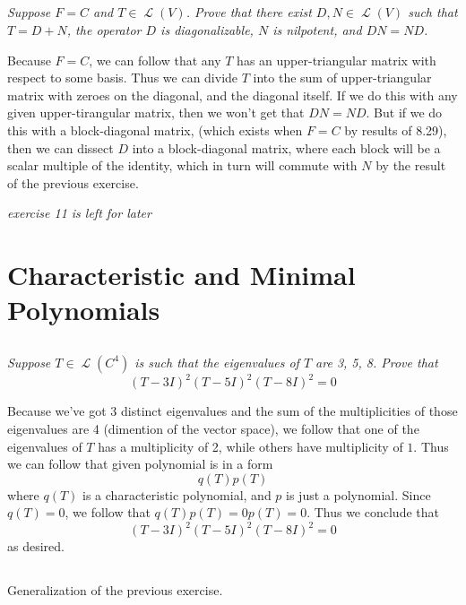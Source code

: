 \documentclass[11pt,oneside,titlepage]{book}
\DeclareMathOperator \map {\mathcal {L}}
\begin{document}
\subsection{}

\textit{Suppose $F = C$ and $T \in \map(V)$. Prove that there exist $D, N \in \map(V)$
  such that $T = D + N$, the operator $D$ is diagonalizable, $N$ is nilpotent,
  and $DN = ND$.}

Because $F = C$, we can follow that any $T$ has an upper-triangular matrix with respect to
some basis. Thus we can divide $T$ into the sum of upper-triangular matrix with zeroes on the
diagonal, and the diagonal itself. If we do this with any given upper-tirangular matrix, then
we won't get that $DN = ND$. But if we do this with a block-diagonal matrix, (which exists when
$F = C$ by results of 8.29),
then  we can dissect $D$ into a block-diagonal matrix, where each block
will be a scalar multiple of the identity, which in turn will commute with $N$ by the result
of the previous exercise.

\textit{exercise 11 is left for later}

\section{Characteristic and Minimal Polynomials}

\subsection{}

\textit{Suppose $T \in \map(C^4)$ is such that the eigenvalues of $T$ are 3, 5, 8. Prove
  that
  $$(T - 3I)^2 (T - 5I)^2(T - 8I)^2 = 0$$
}

Because we've got 3 distinct eigenvalues and the sum of the multiplicities of those eigenvalues
are 4 (dimention of the vector space), we follow that one of the eigenvalues of $T$
has a multiplicity of 2, while others have multiplicity of $1$.
Thus we can follow that given polynomial is in a form
$$q(T)p(T)$$
where $q(T)$ is a characteristic polynomial, and $p$ is just a polynomial. Since $q(T) = 0$,
we follow that $q(T)p(T) = 0 p(T) = 0$. Thus we conclude that 
$$(T - 3I)^2 (T - 5I)^2(T - 8I)^2 = 0$$
as desired.

\subsection{}

Generalization of the previous exercise.
\end{document}
